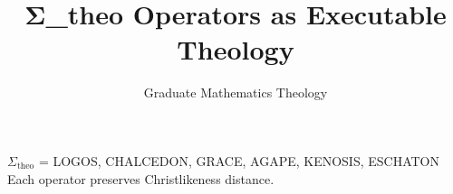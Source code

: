 \documentclass{article}
\begin{document}
\title{Σ_theo Operators as Executable Theology}
\author{Graduate Mathematics Theology}
\maketitle

\begin{theorem}

$\Sigma_{\text{theo}}$ = {LOGOS, CHALCEDON, GRACE, AGAPE, KENOSIS, ESCHATON}
Each operator preserves Christlikeness distance.
            
\end{theorem}
\end{document}
